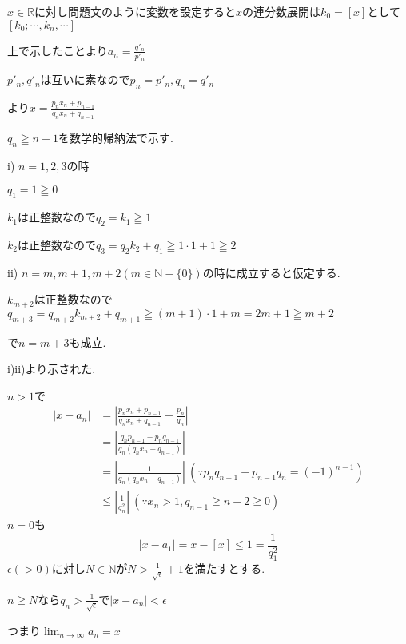 \documentclass{jsarticle}
\begin{document}
       $x\in \mathbb{R}$に対し問題文のように変数を設定すると$x$の連分数展開は$k_0=[x]$として$[k_0;\cdots,k_n,\cdots]$
       
       上で示したことより$a_n=\frac{q'_n}{p'_n}$
       
       $p'_n,q'_n$は互いに素なので$p_n=p'_n,q_n=q'_n$
       
       より$x=\frac{p_nx_n+p_{n-1}}{q_nx_n+q_{n-1}}$
       
       $q_n \geqq n-1$を数学的帰納法で示す.
       
       i) $n=1,2,3$の時
       
       $q_1=1\geqq 0$
       
       $k_1$は正整数なので$q_2=k_1\geqq 1$
       
       $k_2$は正整数なので$q_3=q_2k_2+q_1\geqq 1\cdot 1 + 1 \geqq 2$
       
       ii) $n=m,m+1,m+2 (m\in \mathbb{N}-\{0\})$の時に成立すると仮定する.
       
       $k_{m+2}$は正整数なので$q_{m+3}=q_{m+2}k_{m+2}+q_{m+1} \geqq (m+1)\cdot 1 +m = 2m+1 \geqq m+2 $
       
       で$n=m+3$も成立.
       
       i)ii)より示された.
       
       $n > 1$で
       \begin{align*}
       |x-a_n| &= |\frac{p_nx_n+p_{n-1}}{q_nx_n+q_{n-1}}-\frac{p_n}{q_n}|\\
       &=|\frac{q_np_{n-1}-p_nq_{n-1}}{q_n(q_nx_n+q_{n-1})}|\\
       &= |\frac{1}{q_n(q_nx_n+q_{n-1})}| \ (\because p_nq_{n-1}-p_{n-1}q_n=(-1)^{n-1})\\
       &\leqq |\frac{1}{q_n^2}| \ (\because x_n >1 ,q_{n-1}\geqq n-2\geqq 0) 
       \end{align*}
       $n=0$も
       \[|x-a_1|=x-[x]\leq 1=\frac{1}{q_1^2}\]
       $\epsilon(>0)$に対し$N\in\mathbb{N}$が$N>\frac{1}{\sqrt{\epsilon}}+1$を満たすとする.
       
       $n\geqq N$なら$q_n > \frac{1}{\sqrt{\epsilon}}$で$|x-a_n|<\epsilon$
       
       つまり$\displaystyle\lim_{n\to \infty}a_n=x$
       
\end{document}
